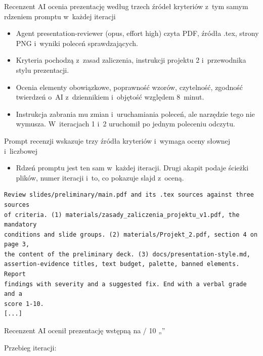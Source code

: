 

\begin{frame}{Recenzent AI ocenia prezentację według trzech źródeł kryteriów z~tym samym rdzeniem promptu w~każdej iteracji}
  \begin{itemize}
    \item Agent presentation-reviewer (opus, effort high) czyta PDF, źródła .tex, strony PNG i~wyniki poleceń sprawdzających.
    \item Kryteria pochodzą z~zasad zaliczenia, instrukcji projektu 2 i~przewodnika stylu prezentacji.
    \item Ocenia elementy obowiązkowe, poprawność wzorów, czytelność, zgodność twierdzeń o~AI z~dziennikiem i~objętość względem 8~minut.
    \item Instrukcja zabrania mu zmian i~uruchamiania poleceń, ale narzędzie tego nie wymusza. W~iteracjach 1 i~2 uruchomił po jednym poleceniu odczytu.
  \end{itemize}
\end{frame}

\begin{frame}[fragile]{Prompt recenzji wskazuje trzy źródła kryteriów i~wymaga oceny słownej i~liczbowej}
  \begin{itemize}
    \item Rdzeń promptu jest ten sam w~każdej iteracji. Drugi akapit podaje ścieżki plików, numer iteracji i~to, co pokazuje slajd z~oceną.
  \end{itemize}
\begin{Verbatim}[commandchars=\\\{\},fontsize=\footnotesize]
Review slides/preliminary/main.pdf and its .tex sources against three sources
of criteria. (1) materials/zasady_zaliczenia_projektu_v1.pdf, the mandatory
conditions and slide groups. (2) materials/Projekt_2.pdf, section 4 on page 3,
the content of the preliminary deck. (3) docs/presentation-style.md,
assertion-evidence titles, text budget, palette, banned elements. Report
findings with severity and a suggested fix. End with a verbal grade and a
score 1-10.
[...]
\end{Verbatim}
\end{frame}

\begin{frame}[c]{Recenzent AI ocenił prezentację wstępną na \resReviewScore{} / 10}
  „\resReviewVerbal”

  \vspace{3mm}
  {\color{mnMuted}\footnotesize Przebieg iteracji: \resReviewHistory\par}
\end{frame}
